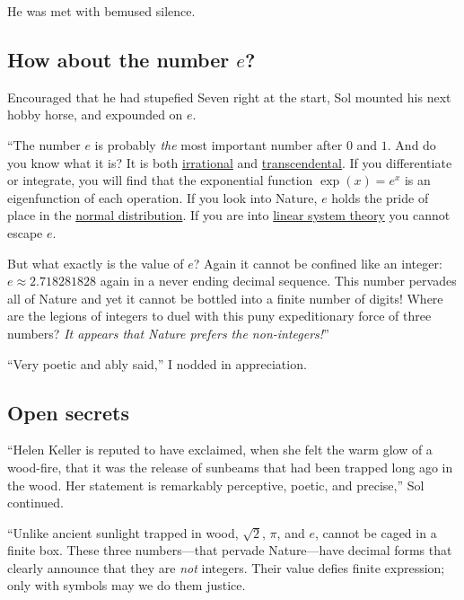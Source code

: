 \documentclass[
  a4paper,
]{article}
\begin{document}
He was met with bemused silence.

\hypertarget{how-about-the-number-e}{%
\subsection{\texorpdfstring{How about the number
\(e\)?}{How about the number e?}}\label{how-about-the-number-e}}

Encouraged that he had stupefied Seven right at the start, Sol mounted
his next hobby horse, and expounded on \(e\).

``The number \(e\) is probably \emph{the} most important number after
\(0\) and \(1\). And do you know what it is? It is both
\href{https://mathworld.wolfram.com/IrrationalNumber.html}{irrational}
and
\href{https://en.wikipedia.org/wiki/Transcendental_number}{transcendental}.
If you differentiate or integrate, you will find that the exponential
function \(\exp(x) = e^x\) is an eigenfunction of each operation. If you
look into Nature, \(e\) holds the pride of place in the
\href{https://www.khanacademy.org/math/statistics-probability/modeling-distributions-of-data/normal-distributions-library/a/normal-distributions-review}{normal
distribution}. If you are into
\href{https://www.cns.nyu.edu/~david/handouts/linear-systems/linear-systems.html}{linear
system theory} you cannot escape \(e\).

But what exactly is the value of \(e\)? Again it cannot be confined like
an integer: \(e \approx 2.718281828\) again in a never ending decimal
sequence. This number pervades all of Nature and yet it cannot be
bottled into a finite number of digits! Where are the legions of
integers to duel with this puny expeditionary force of three numbers?
\emph{It appears that Nature prefers the non-integers!}''

``Very poetic and ably said,'' I nodded in appreciation.

\hypertarget{open-secrets}{%
\subsection{Open secrets}\label{open-secrets}}

``Helen Keller is reputed to have exclaimed, when she felt the warm glow
of a wood-fire, that it was the release of sunbeams that had been
trapped long ago in the wood. Her statement is remarkably perceptive,
poetic, and precise,'' Sol continued.

``Unlike ancient sunlight trapped in wood, \(\sqrt{2}\), \(\pi\), and
\(e\), cannot be caged in a finite box. These three numbers---that
pervade Nature---have decimal forms that clearly announce that they are
\emph{not} integers. Their value defies finite expression; only with
symbols may we do them justice.
\end{document}
